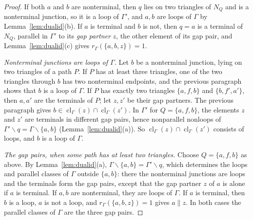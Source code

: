 \documentclass[11pt]{amsart}
\theoremstyle{definition}
\theoremstyle{remark}
\numberwithin{equation}{section}
\newcommand{\cl}{\operatorname{cl}}
\begin{document}
\begin{proof}
If both $a$ and $b$ are nonterminal, then $q$ lies on two triangles of $N_Q$ and is a nonterminal junction, so it is a loop of $\Gamma'$, and $a,b$ are loops of $\Gamma$ by Lemma~\ref{lem:dualid}(b). If $a$ is terminal and $b$ is not, then $q=a$ is a terminal of $N_Q$, parallel in $\Gamma'$ to its \emph{gap partner} $z$, the other element of its gap pair, and Lemma~\ref{lem:dualid}(c) gives $r_\Gamma(\{a,b,z\})=1$.

\emph{Nonterminal junctions are loops of $\Gamma$.} Let $b$ be a nonterminal junction, lying on two triangles of a path $P$. If $P$ has at least three triangles, one of the two triangles through $b$ has two nonterminal endpoints, and the previous paragraph shows that $b$ is a loop of $\Gamma$. If $P$ has exactly two triangles $\{a,f,b\}$ and $\{b,f',a'\}$, then $a,a'$ are the terminals of $P$; let $z,z'$ be their gap partners. The previous paragraph gives $b\in\cl_\Gamma(z)\cap\cl_\Gamma(z')$. In $\Gamma'$ for $Q=\{a,f,b\}$, the elements $z$ and $z'$ are terminals in different gap pairs, hence nonparallel nonloops of $\Gamma'\backslash q=\Gamma\backslash\{a,b\}$ (Lemma~\ref{lem:dualid}(a)). So $\cl_\Gamma(z)\cap\cl_\Gamma(z')$ consists of loops, and $b$ is a loop of $\Gamma$.

\emph{The gap pairs, when some path has at least two triangles.} Choose $Q=\{a,f,b\}$ as above. By Lemma~\ref{lem:dualid}(a), $\Gamma\backslash\{a,b\}=\Gamma'\backslash q$, which determines the loops and parallel classes of $\Gamma$ outside $\{a,b\}$: there the nonterminal junctions are loops and the terminals form the gap pairs, except that the gap partner $z$ of $a$ is alone if $a$ is terminal. If $a,b$ are nonterminal, they are loops of $\Gamma$. If $a$ is terminal, then $b$ is a loop, $a$ is not a loop, and $r_\Gamma(\{a,b,z\})=1$ gives $a\parallel z$. In both cases the parallel classes of $\Gamma$ are the three gap pairs.


\end{proof}
\end{document}
